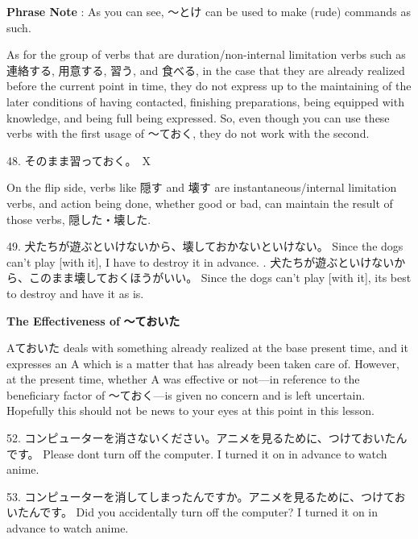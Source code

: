 \par{\textbf{Phrase Note }: As you can see, ～とけ can be used to make (rude) commands as such. }

\par{ As for the group of verbs that are duration\slash non-internal limitation verbs such as 連絡する, 用意する, 習う, and 食べる, in the case that they are already realized before the current point in time, they do not express up to the maintaining of the later conditions of having contacted, finishing preparations, being equipped with knowledge, and being full being expressed. So, even though you can use these verbs with the first usage of ～ておく, they do not work with the second. }

\par{48. そのまま習っておく。　X }

\par{On the flip side, verbs like 隠す and 壊す are instantaneous\slash internal limitation verbs, and action being done, whether good or bad, can maintain the result of those verbs, 隠した・壊した. }

\par{49. 犬たちが遊ぶといけないから、壊しておかないといけない。 \hfill\break
Since the dogs can't play [with it], I have to destroy it in advance. \hfill\break
\hfill{}. 犬たちが遊ぶといけないから、このまま壊しておくほうがいい。 \hfill\break
Since the dogs can't play [with it], it\textquotesingle s best to destroy and have it as is. }

\par{\textbf{The Effectiveness of }\textbf{～ておいた }}

\par{ Aておいた deals with something already realized at the base present time, and it expresses an A which is a matter that has already been taken care of. However, at the present time, whether A was effective or not—in reference to the beneficiary factor of ～ておく—is given no concern and is left uncertain. Hopefully this should not be news to your eyes at this point in this lesson. }

\par{52. コンピューターを消さないください。アニメを見るために、つけておいたんです。 \hfill\break
Please don\textquotesingle t turn off the computer. I turned it on in advance to watch anime. }

\par{53. コンピューターを消してしまったんですか。アニメを見るために、つけておいたんです。 \hfill\break
Did you accidentally turn off the computer? I turned it on in advance to watch anime. }


